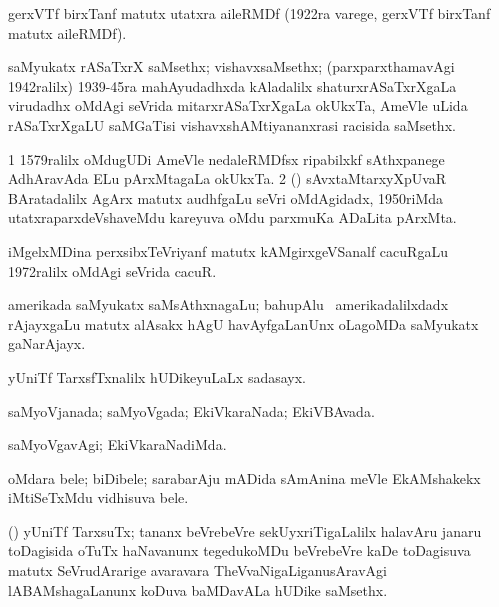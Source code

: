 \bentry 
{}
\gl{\nA}
\expl{}
\bmng
gerxVTf birxTanf matutx utatxra aileRMDf (1922ra varege, gerxVTf birxTanf matutx aileRMDf). 
\emng
\eentry

\bentry
{}
\gl{\nA}
\expl{}
\bmng
saMyukatx rASaTxrX saMsethx; vishavxsaMsethx; (parxparxthamavAgi 1942ralilx) 1939-45ra mahAyudadhxda kAladalilx shaturxrASaTxrXgaLa virudadhx oMdAgi seVrida mitarxrASaTxrXgaLa okUkxTa, AmeVle uLida rASaTxrXgaLU saMGaTisi vishavxshAMtiyananxrasi racisida saMsethx. 
\emng
\eentry

\bentry
{}
\gl{\nA}
\expl{(\ca)}
\bmng
\bnum
\num{1} 1579ralilx oMdugUDi AmeVle nedaleRMDfsx ripabilxkf sAthxpanege AdhAravAda ELu pArxMtagaLa okUkxTa. 
\num{2} (\ca) sAvxtaMtarxyXpUvaR BAratadalilx AgArx matutx audhfgaLu seVri oMdAgidadx, 1950riMda utatxraparxdeVshaveMdu kareyuva oMdu parxmuKa ADaLita pArxMta. 
\enum
\emng
\eentry

\bentry
{}
\gl{\nA}
\expl{}
\bmng
iMgelxMDina perxsibxTeVriyanf matutx kAMgirxgeVSanalf cacuRgaLu 1972ralilx oMdAgi seVrida cacuR. 
\emng
\eentry

\bentry
{}
\gl{\nA}
\expl{}
\bmng
amerikada saMyukatx saMsAthxnagaLu; bahupAlu \kanu\ amerikadalilxdadx  rAjayxgaLu matutx alAsakx hAgU havAyfgaLanUnx oLagoMDa saMyukatx gaNarAjayx. 
\emng
\eentry

\bentry
{} 
\gl{\nA}
\expl{}
\bmng
yUniTf TarxsfTxnalilx hUDikeyuLaLx sadasayx. 
\emng
\eentry

\bentry
{} 
\gl{\gu}
\bmng
saMyoVjanada; saMyoVgada; EkiVkaraNada; EkiVBAvada. 
\emng
\eentry

\bentry
{} 
\gl{\kirxvi}
\expl{}
\bmng
saMyoVgavAgi; EkiVkaraNadiMda. 
\emng
\eentry

\bentry
{}
\gl{\nA}
\expl{}
\bmng
oMdara bele; biDibele; sarabarAju mADida sAmAnina meVle EkAMshakekx iMtiSeTxMdu vidhisuva bele. 
\emng
\eentry

\bentry
{}
\gl{\nA}
\expl{}
\bmng
(\birx) yUniTf TarxsuTx; tananx beVrebeVre sekUyxriTigaLalilx halavAru janaru toDagisida oTuTx haNavanunx tegedukoMDu beVrebeVre kaDe toDagisuva matutx SeVrudArarige avaravara TheVvaNigaLiganusAravAgi lABAMshagaLanunx koDuva baMDavALa hUDike saMsethx. 
\emng
\eentry

